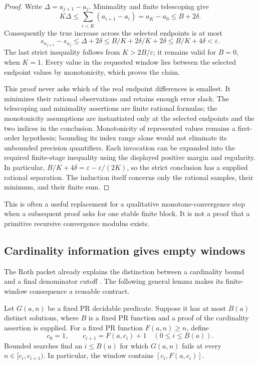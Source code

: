 \begin{proof}
Write \(\Delta=a_{j+1}-a_j\).  Minimality and finite telescoping give
\[
 K\Delta\le\sum_{i<K}(a_{i+1}-a_i)
 =a_K-a_0\le B+2\delta.
\]
Consequently the true increase across the selected endpoints is at most
\[
 s_{n_{j+1}}-s_{n_j}
 \le\Delta+2\delta
 \le B/K+2\delta/K+2\delta
 \le B/K+4\delta<\varepsilon.
\]
The last strict inequality follows from
\(K>2B/\varepsilon\); it remains valid for \(B=0\), when \(K=1\).
Every value in the requested window lies between the selected endpoint
values by monotonicity, which proves the claim.

This proof never asks which of the real endpoint differences is smallest.
It minimizes their rational observations and retains enough error slack.
The telescoping and minimality assertions are finite rational formulas;
the monotonicity assumptions are instantiated only at the selected
endpoints and the two indices in the conclusion.  Monotonicity of
represented values remains a first-order hypothesis; bounding its index
range alone would not eliminate its unbounded precision quantifiers.
Each invocation can be expanded into the required finite-stage inequality
using the displayed positive margin and regularity.  In particular,
\(B/K+4\delta=\varepsilon-\varepsilon/(2K)\), so the strict
conclusion has a supplied rational separation.  The induction itself
concerns only the rational samples, their minimum, and their finite sum.
\end{proof}

This is often a useful replacement for a qualitative monotone-convergence
step when a subsequent proof asks for one stable finite block.  It is
not a proof that a primitive recursive convergence modulus exists.

\subsection{Cardinality information gives empty windows}

The Roth packet already explains the distinction between a cardinality
bound and a final denominator cutoff \cite{repoRoth}.  The following
general lemma makes its finite-window consequence a reusable contract.

\begin{theorem}\label{thm:empty-window}
Let \(G(a,n)\) be a fixed PR decidable predicate.  Suppose it has at most
\(B(a)\) distinct solutions, where \(B\) is a fixed PR function and a
proof of the cardinality assertion is supplied.
For a fixed PR function \(F(a,n)\ge n\), define
\[
 c_0=1,\qquad c_{i+1}=F(a,c_i)+1
 \quad(0\le i\le B(a)).
\]
Bounded searches find an \(i\le B(a)\) for which
\(G(a,n)\) fails at every \(n\in[c_i,c_{i+1})\).
In particular, the window contains \([c_i,F(a,c_i)]\).
\end{theorem}

